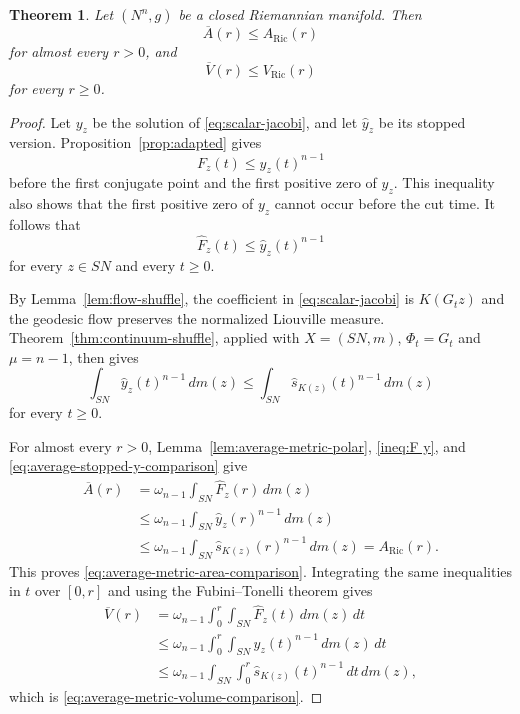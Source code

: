 \documentclass[11pt, reqno]{amsart}
\newtheorem{theorem}{Theorem}
\begin{document}
\begin{theorem}\label{thm:average-metric-comparison}
Let $(N^n, g)$ be a closed Riemannian manifold.
Then
\begin{equation}\label{eq:average-metric-area-comparison}
\overline A(r)\le A_{\operatorname{Ric}}(r)
\end{equation}
for almost every $r>0$, and
\begin{equation}\label{eq:average-metric-volume-comparison}
\overline V(r)\le V_{\operatorname{Ric}}(r)
\end{equation}
for every $r\ge 0$.
\end{theorem}

\begin{proof}
Let $y_z$ be the solution of \eqref{eq:scalar-jacobi}, and let
$\widehat y_z$ be its stopped version. Proposition~\ref{prop:adapted} gives
$$F_z(t)\le y_z(t)^{n-1}$$
before the first conjugate point and the first positive zero of $y_z$.
This inequality also shows that the first positive zero of $y_z$ cannot occur before the cut time.
It follows that
\begin{equation}\label{ineq:F y}
\widehat F_z(t)\le \widehat y_z(t)^{n-1}
\end{equation}
for every $z\in SN$ and every $t\ge 0$.

By Lemma~\ref{lem:flow-shuffle}, the coefficient in
\eqref{eq:scalar-jacobi} is $K(G_tz)$ and the geodesic flow preserves the normalized Liouville measure. Theorem~\ref{thm:continuum-shuffle}, applied
with $X=(SN, m)$, $\Phi_t=G_t$ and $\mu=n-1$, then gives
\begin{equation}\label{eq:average-stopped-y-comparison}
\int_{SN}\widehat y_z(t)^{n-1}\, dm(z)
\le
\int_{SN}\widehat s_{K(z)}(t)^{n-1}\, dm(z)
\end{equation}
for every $t\ge 0$.

For almost every $r>0$, Lemma~\ref{lem:average-metric-polar},
\eqref{ineq:F y}, and
\eqref{eq:average-stopped-y-comparison} give
\begin{align*}
\overline A(r)
& =
\omega_{n-1}\int_{SN}\widehat F_z(r)\, dm(z)\\
& \le
\omega_{n-1}\int_{SN}\widehat y_z(r)^{n-1}\, dm(z)\\
& \le
\omega_{n-1}\int_{SN}
\widehat s_{K(z)}(r)^{n-1}\, dm(z)
=
A_{\operatorname{Ric}}(r).
\end{align*}
This proves \eqref{eq:average-metric-area-comparison}. Integrating the same
inequalities in $t$ over $[0, r]$ and using the Fubini--Tonelli theorem gives
\begin{align*}
\overline V(r)
& =
\omega_{n-1}\int_0^r\int_{SN}
\widehat F_z(t)\, dm(z)\, dt\\
& \le
\omega_{n-1}\int_0^r\int_{SN}
\widehat y_z(t)^{n-1}\, dm(z)\, dt\\
& \le
\omega_{n-1}\int_{SN}\int_0^r
\widehat s_{K(z)}(t)^{n-1}\, dt\, dm(z),
\end{align*}
which is \eqref{eq:average-metric-volume-comparison}.
\end{proof}
\end{document}
